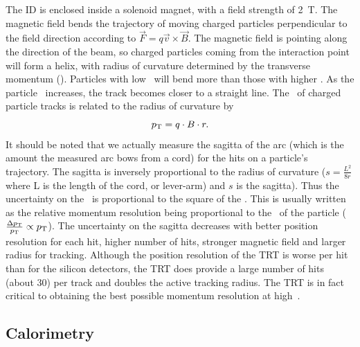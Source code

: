 The ID is enclosed inside a solenoid magnet, with a field strength of 2~T.
The magnetic field bends the trajectory of moving charged particles
perpendicular to the field direction according to
$\vec{F} = q \vec{v}\times \vec{B}$.
The magnetic field is pointing along the direction of the beam, so charged
particles coming from the interaction point will form a helix, with radius
of curvature determined by the transverse momentum (\pt).
Particles with low \pt\ will bend more than those with higher \pt.
As the particle \pt\ increases, the track becomes closer to a straight line.
The \pt\ of charged particle tracks is related to the radius of curvature by
\begin{equation}
  p_{\mathrm{T}} = q \cdot B \cdot r.
\end{equation}
It should be noted that we actually measure the sagitta of the arc (which is
the amount the measured arc bows from a cord) for the hits on a particle's
trajectory.
The sagitta is inversely proportional to the radius of
curvature ($s=\frac{L^2}{8r}$ where L is the length of the cord, or lever-arm)
and $s$ is the sagitta).
Thus the uncertainty on the \pt\ is proportional to the square of the \pt.
This is usually written as the relative momentum resolution being proportional
to the \pt\ of the particle ($\frac{\Delta p_{\mathrm{T}}}{p_{\mathrm{T}}} \propto p_{\mathrm{T}}$).
The uncertainty on the sagitta decreases with better position resolution for
each hit, higher number of hits, stronger magnetic field and larger radius for
tracking.
Although the position resolution of the TRT is worse per hit than for the
silicon detectors, the TRT does provide a large number of hits (about 30) per
track and doubles the active tracking radius.
The TRT is in fact critical to obtaining the best possible momentum resolution
at high~\pt.

\FloatBarrier
\subsection{Calorimetry} 
\label{sec:calo}

